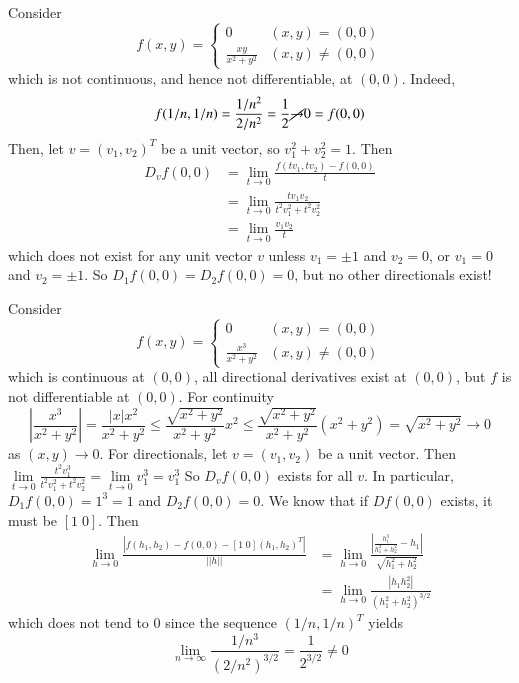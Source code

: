 \begin{eg}
    Consider $$f(x,y) = \left\{\begin{array}{cc} 0 & (x,y) = (0,0) \\ \frac{xy}{x^2+y^2} & (x,y) \neq (0,0)\end{array}\right.$$ which is not continuous, and hence not differentiable, at $(0,0)$. Indeed, $$f(1/n,1/n) = \frac{1/n^2}{2/n^2} = \frac{1}{2}\cancel{\rightarrow}0 = f(0,0)$$ Then, let $v = (v_1,v_2)^T$ be a unit vector, so $v_1^2+v_2^2 = 1$. Then \begin{align*}
        D_vf(0,0) &= \lim\limits_{t\rightarrow 0}\frac{f(tv_1,tv_2)-f(0,0)}{t} \\
        &= \lim\limits_{t\rightarrow 0}\frac{tv_1v_2}{t^2v_1^2+t^2v_2^2} \\
        &= \lim\limits_{t\rightarrow 0}\frac{v_1v_2}{t}
    \end{align*}
    which does not exist for any unit vector $v$ unless $v_1 = \pm 1$ and $v_2 = 0$, or $v_1 = 0$ and $v_2 = \pm 1$. So $D_1f(0,0) = D_2f(0,0) = 0$, but no other directionals exist!
\end{eg}

\begin{eg}
    Consider $$f(x,y) = \left\{\begin{array}{cc} 0 & (x,y) = (0,0) \\ \frac{x^3}{x^2+y^2} & (x,y) \neq (0,0) \end{array}\right.$$ which is continuous at $(0,0)$, all directional derivatives exist at $(0,0)$, but $f$ is not differentiable at $(0,0)$. For continuity $$\left|\frac{x^3}{x^2+y^2}\right| = \frac{|x|x^2}{x^2+y^2} \leq \frac{\sqrt{x^2+y^2}}{x^2+y^2}x^2 \leq \frac{\sqrt{x^2+y^2}}{x^2+y^2}(x^2+y^2) = \sqrt{x^2+y^2}\rightarrow 0$$ as $(x,y) \rightarrow 0$. For directionals, let $v = (v_1,v_2)$ be a unit vector. Then $\lim\limits_{t\rightarrow 0}\frac{t^2v_1^3}{t^2v_1^2+t^2v_2^2} = \lim\limits_{t\rightarrow 0}v_1^3 = v_1^3$ So $D_vf(0,0)$ exists for all $v$. In particular, $D_1f(0,0) = 1^3 = 1$ and $D_2f(0,0) = 0$. We know that if $Df(0,0)$ exists, it must be $[1\;0]$. Then \begin{align*}
        \lim\limits_{h\rightarrow 0}\frac{|f(h_1,h_2) - f(0,0) - [1\;0](h_1,h_2)^T|}{||h||} &= \lim\limits_{h\rightarrow 0}\frac{\left|\frac{h_1^3}{h_1^2+h_2^2} - h_1\right|}{\sqrt{h_1^2+h_2^2}} \\
        &= \lim\limits_{h\rightarrow 0}\frac{|h_1h_2^2|}{(h_1^2+h_2^2)^{3/2}}
    \end{align*}
    which does not tend to $0$ since the sequence $(1/n,1/n)^T$ yields $$\lim\limits_{n\rightarrow \infty}\frac{1/n^3}{(2/n^2)^{3/2}} = \frac{1}{2^{3/2}} \neq 0$$
\end{eg}



